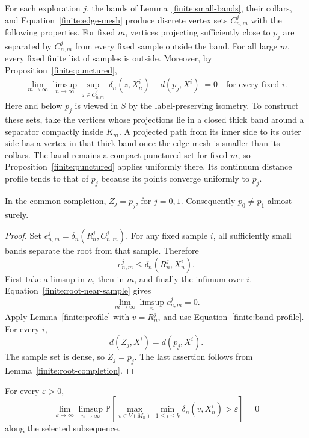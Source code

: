 For each exploration \(j\), the bands of
Lemma~\ref{finite:small-bands}, their collars, and
Equation~\eqref{finite:edge-mesh} produce discrete vertex sets
\(C_{n,m}^j\) with the following properties.
For fixed \(m\), vertices projecting sufficiently close to
\(p_j\) are separated by \(C_{n,m}^j\) from every fixed sample
outside the band.  For all large \(m\), every fixed finite
list of samples is outside.  Moreover, by
Proposition~\ref{finite:punctured},
\begin{equation}
 \lim_{m\to\infty}\limsup_{n\to\infty}
 \sup_{z\in C_{n,m}^j}
       |\delta_n(z,X_n^i)-d(p_j,X^i)|=0
 \quad\text{for every fixed }i .
 \label{finite:band-profile}
\end{equation}
Here and below \(p_j\) is viewed in \(S\) by the
label-preserving isometry.
To construct these sets, take the vertices whose projections
lie in a closed thick band around a separator compactly
inside \(K_m\).  A projected path from its inner side to its
outer side has a vertex in that thick band once the edge
mesh is smaller than its collars.  The band remains a
compact punctured set for fixed \(m\), so
Proposition~\ref{finite:punctured} applies uniformly there.
Its continuum distance profile tends to that of \(p_j\)
because its points converge uniformly to \(p_j\).

\begin{lemma}
\label{finite:root-identification}
In the common completion, \(Z_j=p_j\), for \(j=0,1\).
Consequently \(p_0\ne p_1\) almost surely.
\end{lemma}

\begin{proof}
Set
\(e_{n,m}^j=\delta_n(R_n^j,C_{n,m}^j)\).
For any fixed sample \(i\), all sufficiently small bands
separate the root from that sample.  Therefore
\[
               e_{n,m}^j\le\delta_n(R_n^j,X_n^i).
\]
First take a limsup in \(n\), then in \(m\), and finally the
infimum over \(i\).  Equation~\eqref{finite:root-near-sample}
gives
\[
                 \lim_{m\to\infty}\limsup_n e_{n,m}^j=0.
\]
Apply Lemma~\ref{finite:profile} with \(v=R_n^j\), and use
Equation~\eqref{finite:band-profile}.  For every \(i\),
\[
                   d(Z_j,X^i)=d(p_j,X^i).
\]
The sample set is dense, so \(Z_j=p_j\).
The last assertion follows from
Lemma~\ref{finite:root-completion}.
\end{proof}

\begin{proposition}
\label{finite:metric-nets}
For every \(\varepsilon>0\),
\[
 \lim_{k\to\infty}\limsup_{n\to\infty}
 \mathbb P\!\left[
   \max_{v\in V(M_n)}\min_{1\le i\le k}
       \delta_n(v,X_n^i)>\varepsilon
 \right]=0
\]
along the selected subsequence.
\end{proposition}

